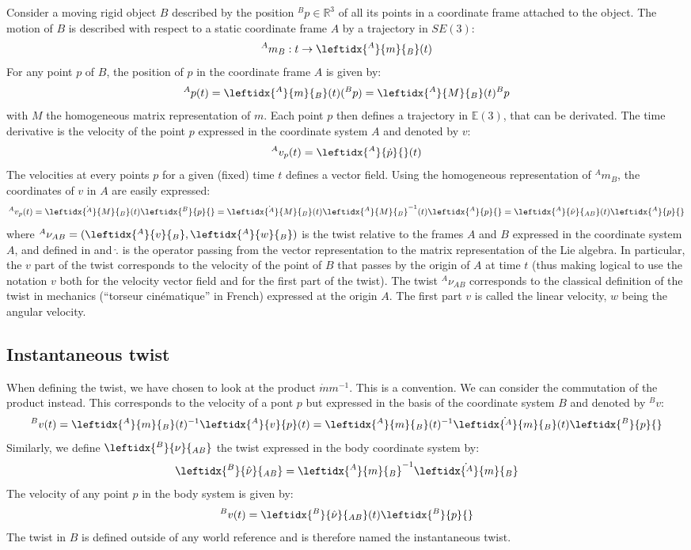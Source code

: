 \documentclass{book}
\begin{document}
Consider a moving rigid object $B$ described by the position $^Bp \in \mathbb{R}^3$  of all its points in a coordinate frame attached to the object. The motion of $B$ is described with respect to a static coordinate frame $A$ by a trajectory in $SE(3)$:
$$ ^Am_B: t \rightarrow \leftidx{^A}{m}{_B}(t) $$
For any point $p$ of $B$, the position of $p$ in the coordinate frame $A$ is given by:
$$ ^Ap(t) = \leftidx{^A}{m}{_B}(t) (^Bp) = \leftidx{^A}{M}{_B}(t) ^Bp $$
with $M$ the homogeneous matrix representation of $m$. Each point $p$ then defines a trajectory in $\mathbb{E}(3)$, that can be derivated. The time derivative is the velocity of the point $p$ expressed in the coordinate system $A$ and denoted by $v$:
$$ ^Av_p(t) =  \leftidx{^A}{\dot p}{}(t) $$
The velocities at every points $p$ for a given (fixed) time $t$ defines a vector field. Using the homogeneous representation of $^Am_B$, the coordinates of $v$ in $A$ are easily expressed:
$$ ^Av_p(t) = \dot{ \leftidx{^A}{M}{_B}}(t) \leftidx{^B}{p}{} =  \dot{ \leftidx{^A}{M}{_B}}(t) \leftidx{^A}{M}{_B}^{-1}(t) \leftidx{^A}{p}{} = \leftidx{^A}{\hat \nu}{_{AB}}(t)  \leftidx{^A}{p}{}  $$
where $^A\nu_{AB} = ( \leftidx{^A}{v}{_B},\leftidx{^A}{w}{_B} )$ is the twist relative to the frames $A$ and $B$ expressed in the coordinate system $A$, and defined in  and $\hat .$ is the operator passing from the vector representation to the matrix representation of the Lie algebra. In particular, the $v$ part of the twist corresponds to the velocity of the point of $B$ that passes by the origin of $A$ at time $t$ (thus making logical to use the notation $v$ both for the velocity vector field and for the first part of the twist).  The twist $^A\nu_{AB}$ corresponds to the classical definition of the twist in mechanics (``torseur cin\'ematique'' in French) expressed at the origin $A$. The first part $v$ is called the linear velocity, $w$ being the angular velocity.



\subsection{Instantaneous twist}

When defining the twist, we have chosen to look at the product $\dot{m} m^{-1}$. This is a convention. We can consider the commutation of the product instead. This corresponds to the velocity of a pont $p$ but expressed in the basis of the coordinate system $B$ and denoted by $^Bv$:
$$ ^Bv(t) = \leftidx{^A}{m}{_B}(t)^{-1} \leftidx{^A}{v}{p}(t) = 
\leftidx{^A}{m}{_B}(t)^{-1} \dot{\leftidx{^A}{m}{_B}}(t) \leftidx{^B}{p}{} $$ 
Similarly, we define $\leftidx{^B}{\nu}{_{AB}}$ the twist expressed in the body coordinate system by:
$$ \leftidx{^B}{\hat \nu}{_{AB}} =\leftidx{^A}{m}{_B}^{-1} \dot{\leftidx{^A}{m}{_B}}$$
The velocity of any point $p$ in the body system is given by:
$$ ^Bv(t) = \leftidx{^B}{\hat \nu}{_{AB}}(t) \leftidx{^B}{p}{} $$
The twist in $B$ is defined outside of any world reference and is therefore named the instantaneous twist.
\end{document}
